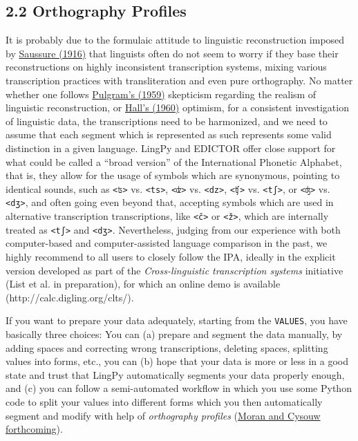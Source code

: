 \documentclass[a4paper,svgnames]{scrartcl}
\begin{document}
\subsection*{2.2 Orthography Profiles}\label{orthography-profiles}

It is probably due to the formulaic attitude to linguistic
reconstruction imposed by
\href{http://bibliography.lingpy.org?key=Saussure1916}{Saussure (1916)}
that linguists often do not seem to worry if they base their
reconstructions on highly inconsistent transcription systems, mixing
various transcription practices with transliteration and even pure
orthography. No matter whether one follows
\href{http://bibliography.lingpy.org?key=Pulgram1959}{Pulgram's (1959)}
skepticism regarding the realism of linguistic reconstruction, or
\href{http://bibliography.lingpy.org?key=Hall1960}{Hall's (1960)}
optimism, for a consistent investigation of linguistic data, the
transcriptions need to be harmonized, and we need to assume that each
segment which is represented as such represents some valid distinction
in a given language. LingPy and EDICTOR offer close support for what
could be called a ``broad version'' of the International Phonetic
Alphabet, that is, they allow for the usage of symbols which are
synonymous, pointing to identical sounds, such as
\texttt{\textless{}ʦ\textgreater{}} vs.
\texttt{\textless{}ts\textgreater{}},
\texttt{\textless{}ʣ\textgreater{}} vs.
\texttt{\textless{}dz\textgreater{}},
\texttt{\textless{}ʧ\textgreater{}} vs.
\texttt{\textless{}tʃ\textgreater{}}, or
\texttt{\textless{}ʤ\textgreater{}} vs.
\texttt{\textless{}dʒ\textgreater{}}, and often going even beyond that,
accepting symbols which are used in alternative transcription
transcriptions, like \texttt{\textless{}č\textgreater{}} or
\texttt{\textless{}ž\textgreater{}}, which are internally treated as
\texttt{\textless{}tʃ\textgreater{}} and
\texttt{\textless{}dʒ\textgreater{}}. Nevertheless, judging from our
experience with both computer-based and computer-assisted language
comparison in the past, we highly recommend to all users to closely
follow the IPA, ideally in the explicit version developed as part of the
\emph{Cross-linguistic transcription systems} initiative (List et al. in
preparation), for which an online demo is available
(http://calc.digling.org/clts/).

If you want to prepare your data adequately, starting from the
\texttt{VALUES}, you have basically three choices: You can (a) prepare
and segment the data manually, by adding spaces and correcting wrong
transcriptions, deleting spaces, splitting values into forms, etc., you
can (b) hope that your data is more or less in a good state and trust
that LingPy automatically segments your data properly enough, and (c)
you can follow a semi-automated workflow in which you use some Python
code to split your values into different forms which you then
automatically segment and modify with help of \emph{orthography
profiles} (\href{http://bibliography.lingpy.org?key=Moran2017}{Moran and
Cysouw forthcoming}).
\end{document}
